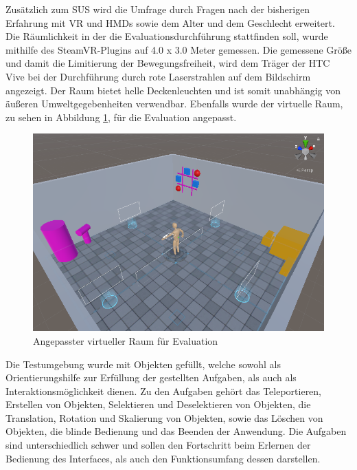 \noindent Zusätzlich zum SUS wird die Umfrage durch Fragen nach der bisherigen Erfahrung mit VR und HMDs sowie dem Alter und dem Geschlecht erweitert. Die Räumlichkeit in der die Evaluationsdurchführung stattfinden soll, wurde mithilfe des SteamVR-Plugins auf 4.0 x 3.0 Meter gemessen. Die gemessene Größe und damit die Limitierung der Bewegungsfreiheit, wird dem Träger der HTC Vive bei der Durchführung durch rote Laserstrahlen auf dem Bildschirm angezeigt. Der Raum bietet helle Deckenleuchten und ist somit unabhängig von äußeren Umweltgegebenheiten verwendbar. Ebenfalls wurde der virtuelle Raum, zu sehen in Abbildung \ref{fig:evaraum}, für die Evaluation angepasst.

\begin{figure}[h]
\captionsetup{width=.7\linewidth}
\includegraphics[scale=0.5]{Bilder/Hauptteil/BildRaum}
\centering
\caption{Angepasster virtueller Raum für Evaluation}
\label{fig:evaraum}
\end{figure}

\noindent Die Testumgebung wurde mit Objekten gefüllt, welche sowohl als Orientierungshilfe zur Erfüllung der gestellten Aufgaben, als auch als Interaktionsmöglichkeit dienen. Zu den Aufgaben gehört das Teleportieren, Erstellen von Objekten, Selektieren und Deselektieren von Objekten, die Translation, Rotation und Skalierung von Objekten, sowie das Löschen von Objekten, die blinde Bedienung und das Beenden der Anwendung. Die Aufgaben sind unterschiedlich schwer und sollen den Fortschritt beim Erlernen der Bedienung des Interfaces, als auch den Funktionsumfang dessen darstellen.

